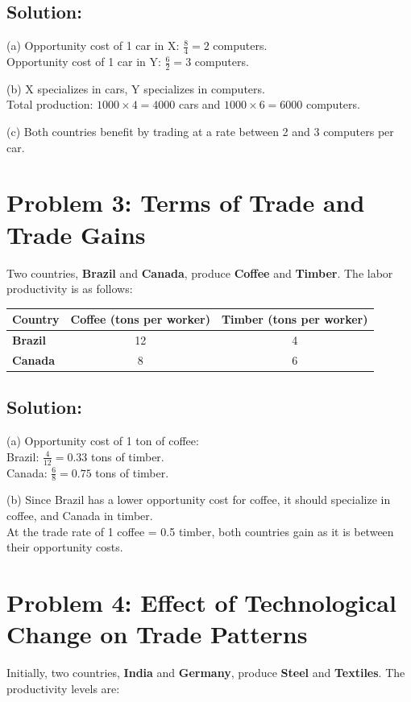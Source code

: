 \documentclass{article}
\begin{document}
\subsection*{Solution:}
(a) Opportunity cost of 1 car in X: \( \frac{8}{4} = 2 \) computers.  \\
Opportunity cost of 1 car in Y: \( \frac{6}{2} = 3 \) computers.

(b) X specializes in cars, Y specializes in computers.  \\
Total production: \( 1000 \times 4 = 4000 \) cars and \( 1000 \times 6 = 6000 \) computers.

(c) Both countries benefit by trading at a rate between 2 and 3 computers per car.

\section*{Problem 3: Terms of Trade and Trade Gains}
Two countries, \textbf{Brazil} and \textbf{Canada}, produce \textbf{Coffee} and \textbf{Timber}. The labor productivity is as follows:

\begin{table}[h]
    \centering
    \begin{tabular}{lcc}
        \toprule
        Country & Coffee (tons per worker) & Timber (tons per worker) \\
        \midrule
        \textbf{Brazil} & 12 & 4 \\
        \textbf{Canada} & 8 & 6 \\
        \bottomrule
    \end{tabular}
\end{table}

\subsection*{Solution:}
(a) Opportunity cost of 1 ton of coffee:  \\
Brazil: \( \frac{4}{12} = 0.33 \) tons of timber.  \\
Canada: \( \frac{6}{8} = 0.75 \) tons of timber.

(b) Since Brazil has a lower opportunity cost for coffee, it should specialize in coffee, and Canada in timber.  \\
At the trade rate of 1 coffee = 0.5 timber, both countries gain as it is between their opportunity costs.

\section*{Problem 4: Effect of Technological Change on Trade Patterns}
Initially, two countries, \textbf{India} and \textbf{Germany}, produce \textbf{Steel} and \textbf{Textiles}. The productivity levels are:
\end{document}
